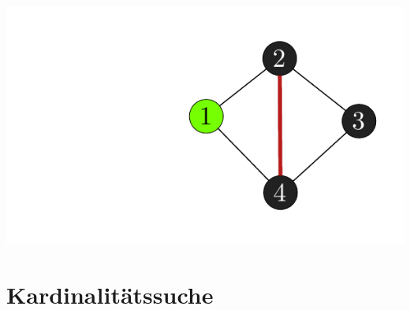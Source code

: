 \documentclass[xcolor=x11names,compress]{beamer}
\begin{document}
\begin{frame}
\begin{overprint}
		\includegraphics[scale=1.0]{img/graph/nodes/04.pdf}
	\end{overprint}
\end{frame}

\section{Kardinalitätssuche}
\end{document}
